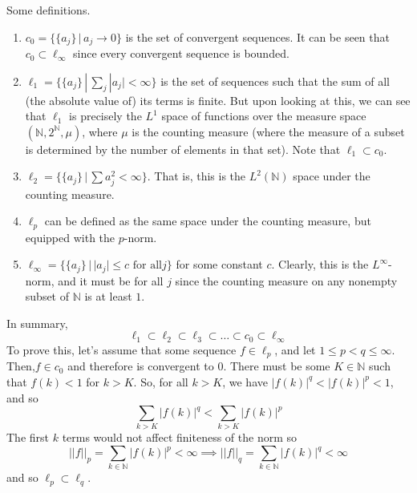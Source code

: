 \documentclass{article}
\theoremstyle{remark}
\theoremstyle{definition}
\begin{document}
Some definitions. 
\begin{enumerate}
    \item $c_0 = \big\{ \{a_j\} \,|\, a_j \rightarrow 0 \big\}$ is the set of convergent sequences. It can be seen that $c_0 \subset \ell_\infty$ since every convergent sequence is bounded. 
    \item $\ell_1 = \big\{ \{a_j\} \,|\, \sum_j |a_j| < \infty\}$ is the set of sequences such that the sum of all (the absolute value of) its terms is finite. But upon looking at this, we can see that $\ell_1$ is precisely the $L^1$ space of functions over the measure space $(\mathbb{N}, 2^\mathbb{N}, \mu)$, where $\mu$ is the counting measure (where the measure of a subset is determined by the number of elements in that set). Note that $\ell_1 \subset c_0$. 
    \item $\ell_2 = \big\{ \{a_j\} \,|\, \sum a_j^2 < \infty \big\}$. That is, this is the $L^2 (\mathbb{N})$ space under the counting measure. 
    \item $\ell_p$ can be defined as the same space under the counting measure, but equipped with the $p$-norm. 
    \item $\ell_\infty = \big\{ \{ a_j \} \,|\, |a_j| \leq c \text{ for all} j \big\}$ for some constant $c$. Clearly, this is the $L^\infty$-norm, and it must be for all $j$ since the counting measure on any nonempty subset of $\mathbb{N}$ is at least $1$.  
\end{enumerate}
In summary, 
\[\ell_1 \subset \ell_2 \subset \ell_3 \subset \ldots \subset c_0 \subset \ell_\infty\]
To prove this, let's assume that some sequence $f \in \ell_p$, and let $1 \leq p < q \leq \infty$. Then,$f \in c_0$ and therefore is convergent to $0$. There must be some $K \in \mathbb{N}$ such that $f(k) < 1$ for $k > K$. So, for all $k > K$, we have $|f(k)|^q < |f(k)|^p < 1$, and so 
\[\sum_{k > K} |f(k)|^q < \sum_{k > K} |f(k)|^p\]
The first $k$ terms would not affect finiteness of the norm so 
\[||f||_p = \sum_{k \in \mathbb{N}} |f(k)|^p < \infty \implies ||f||_q = \sum_{k \in \mathbb{N}} |f(k)|^q < \infty\]
and so $\ell_p \subset \ell_q$. \qedsymbol 
\end{document}
